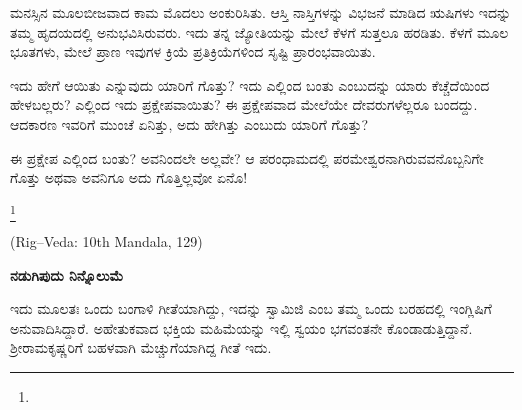 ಮನಸ್ಸಿನ ಮೂಲಬೀಜವಾದ ಕಾಮ ಮೊದಲು ಅಂಕುರಿಸಿತು. ಆಸ್ತಿ ನಾಸ್ತಿಗಳನ್ನು ವಿಭಜನೆ ಮಾಡಿದ ಋಷಿಗಳು ಇದನ್ನು ತಮ್ಮ ಹೃದಯದಲ್ಲಿ ಅನುಭವಿಸಿರುವರು. ಇದು ತನ್ನ ಜ್ಯೋತಿಯನ್ನು ಮೇಲೆ ಕೆಳಗೆ ಸುತ್ತಲೂ ಹರಡಿತು. ಕೆಳಗೆ ಮೂಲ ಭೂತಗಳು, ಮೇಲೆ ಪ್ರಾಣ ಇವುಗಳ ಕ್ರಿಯೆ ಪ್ರತಿಕ್ರಿಯೆಗಳಿಂದ ಸೃಷ್ಟಿ ಪ್ರಾರಂಭವಾಯಿತು.

ಇದು ಹೇಗೆ ಆಯಿತು ಎನ್ನುವುದು ಯಾರಿಗೆ ಗೊತ್ತು? ಇದು ಎಲ್ಲಿಂದ ಬಂತು ಎಂಬುದನ್ನು ಯಾರು ಕೆಚ್ಚೆದೆಯಿಂದ ಹೇಳಬಲ್ಲರು? ಎಲ್ಲಿಂದ ಇದು ಪ್ರಕ್ಷೇಪವಾಯಿತು? ಈ ಪ್ರಕ್ಷೇಪವಾದ ಮೇಲೆಯೇ ದೇವರುಗಳೆಲ್ಲರೂ ಬಂದದ್ದು. ಆದಕಾರಣ ಇವರಿಗೆ ಮುಂಚೆ ಏನಿತ್ತು, ಅದು ಹೇಗಿತ್ತು ಎಂಬುದು ಯಾರಿಗೆ ಗೊತ್ತು?

ಈ ಪ್ರಕ್ಷೇಪ ಎಲ್ಲಿಂದ ಬಂತು? ಅವನಿಂದಲೇ ಅಲ್ಲವೇ? ಆ ಪರಂಧಾಮದಲ್ಲಿ ಪರಮೇಶ್ವರನಾಗಿರುವವನೊಬ್ಬನಿಗೇ ಗೊತ್ತು ಅಥವಾ ಅವನಿಗೂ ಅದು ಗೊತ್ತಿಲ್ಲವೋ ಏನೊ!

\protect\footnote{}

\begin{center}
(Rig–Veda: 10th Mandala, 129)
\end{center}

\begin{myquote}
\end{myquote}

\begin{myquote}
\end{myquote}

\begin{center}
\textbf{ನಡುಗಿಪುದು ನಿನ್ನೊಲುಮೆ}
\end{center}

ಇದು ಮೂಲತಃ ಒಂದು ಬಂಗಾಳಿ ಗೀತೆಯಾಗಿದ್ದು, ಇದನ್ನು ಸ್ವಾಮಿಜಿ  ಎಂಬ ತಮ್ಮ ಒಂದು ಬರಹದಲ್ಲಿ ಇಂಗ್ಲಿಷಿಗೆ ಅನುವಾದಿಸಿದ್ದಾರೆ. ಅಹೇತುಕವಾದ ಭಕ್ತಿಯ ಮಹಿಮೆಯನ್ನು ಇಲ್ಲಿ ಸ್ವಯಂ ಭಗವಂತನೇ ಕೊಂಡಾಡುತ್ತಿದ್ದಾನೆ. ಶ‍್ರೀರಾಮಕೃಷ್ಣರಿಗೆ ಬಹಳವಾಗಿ ಮೆಚ್ಚುಗೆಯಾಗಿದ್ದ ಗೀತೆ ಇದು.


